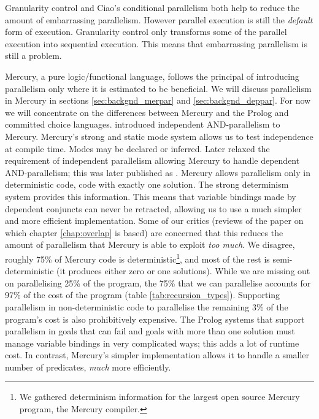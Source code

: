 Granularity control and Ciao's conditional parallelism both help to
reduce the amount of embarrassing parallelism.
However parallel execution is still the \emph{default}
form of execution.
Granularity control only transforms some of the parallel execution into
sequential execution.
This means that embarrassing parallelism is still a problem.

Mercury,
a pure logic/functional language,
follows the principal of introducing parallelism only where it is
estimated to be beneficial.
We will discuss parallelism in Mercury in sections
\ref{sec:backgnd_merpar} and \ref{sec:backgnd_deppar}.
For now we will concentrate on the differences between Mercury
and the Prolog and committed choice languages.
\citet*{conway:2002:par} introduced independent AND-parallelism
to Mercury.
Mercury's strong and static mode system allows us to test independence at
compile time.
Modes may be declared or inferred.
Later \citet*{wang:2006:hons} relaxed the requirement of independent
parallelism allowing Mercury to handle dependent AND-parallelism;
this was later published as \citet*{wang:2011:dep-par}.
Mercury allows parallelism only in deterministic code,
code with exactly one solution.
The strong determinism system provides this information.
This means that variable bindings made by dependent conjuncts can never be
retracted,
allowing us to use a much simpler and more efficient implementation.
Some of our critics (reviews of the paper \citet{bone:2011:overlap}
on which chapter \ref{chap:overlap} is based)
are concerned that this reduces the amount of parallelism that Mercury is
able to exploit \emph{too much}.
We disagree,
roughly 75\% of Mercury code is deterministic\footnote{
    We gathered determinism information for the
    largest open source Mercury program, the Mercury compiler.
}, and most of the rest is semi-deterministic
(it produces either zero or one solutions).
While we are missing out on parallelising 25\% of the
program,
the 75\% that we can parallelise accounts for 97\% of the cost of the
program (table \ref{tab:recursion_types}).
Supporting parallelism in non-deterministic code to parallelise the
remaining 3\% of the program's cost is also prohibitively expensive.
The Prolog systems that support parallelism in goals that can fail and
goals with more than one solution must manage variable bindings
in very complicated ways;
this adds a lot of runtime cost.
In contrast, Mercury's simpler implementation allows it to handle a
smaller number of predicates, \emph{much} more efficiently.

